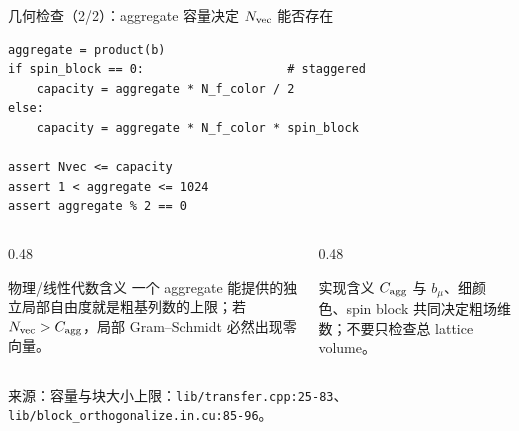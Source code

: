 \documentclass[UTF8,aspectratio=169,11pt]{ctexbeamer}
\newcommand{\source}[1]{\vspace{0.05em}\par{\raggedright\scriptsize\color{muted}来源：#1\par}}
\newcommand{\codepath}[1]{\nolinkurl{#1}}
\begin{document}
\begin{frame}[fragile,t]{几何检查（2/2）：aggregate 容量决定 \(N_{\rm vec}\) 能否存在}
  \begin{lstlisting}[firstnumber=1]
aggregate = product(b)
if spin_block == 0:                    # staggered
    capacity = aggregate * N_f_color / 2
else:
    capacity = aggregate * N_f_color * spin_block

assert Nvec <= capacity
assert 1 < aggregate <= 1024
assert aggregate % 2 == 0
  \end{lstlisting}
  \vspace{0.10cm}
  \begin{columns}[T,totalwidth=\textwidth]
    \begin{column}{0.48\textwidth}
      \begin{block}{物理/线性代数含义}
        一个 aggregate 能提供的独立局部自由度就是粗基列数的上限；若 \(N_{\rm vec}>C_{\rm agg}\)，局部 Gram--Schmidt 必然出现零向量。
      \end{block}
    \end{column}
    \begin{column}{0.48\textwidth}
      \begin{alertblock}{实现含义}
        \(C_{\rm agg}\) 与 \(b_\mu\)、细颜色、spin block 共同决定粗场维数；不要只检查总 lattice volume。
      \end{alertblock}
    \end{column}
  \end{columns}
  \source{容量与块大小上限：\codepath{lib/transfer.cpp:25-83}、\codepath{lib/block_orthogonalize.in.cu:85-96}。}
\end{frame}
\end{document}
